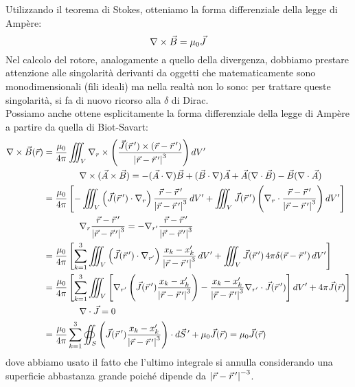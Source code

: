 Utilizzando il teorema di Stokes, otteniamo la forma differenziale della legge di Ampère:
\begin{equation}
	\nabla\times\vec{B} = \mu_0 \vec{J}
	\label{eq:ampere-diff}
\end{equation}
Nel calcolo del rotore, analogamente a quello della divergenza, dobbiamo prestare attenzione alle singolarità derivanti da oggetti che matematicamente sono monodimensionali (fili ideali) ma nella realtà non lo sono: per trattare queste singolarità, si fa di nuovo ricorso alla $ \delta $ di Dirac. \\ 
%
Possiamo anche ottene esplicitamente la forma differenziale della legge di Ampère a partire da quella di Biot-Savart:
\begin{equation}
	\begin{split}
	 	\nabla\times\vec{B}(\vec{r}) &= \displaystyle\frac{\mu_0}{4\pi} \iiint_V \nabla_r \times \left( \displaystyle\frac{\vec{J}(\vec{r}\,') \times (\vec{r} - \vec{r}\,')}{\left\lvert\vec{r} - \vec{r}\,'\right\rvert^3} \right) dV' \\
				     & \qquad\qquad \nabla\times(\vec{A}\times\vec{B}) = - (\vec{A}\cdot\nabla)\vec{B} + (\vec{B}\cdot\nabla)\vec{A} + \vec{A}(\nabla\cdot\vec{B}) - \vec{B}(\nabla\cdot\vec{A}) \\ 
				     &= \displaystyle\frac{\mu_0}{4\pi} \left[ - \iiint_V \left( \vec{J}(\vec{r}\,') \cdot \nabla_r \right) \frac{\vec{r} - \vec{r}\,'}{\left\lvert\vec{r} - \vec{r}\,'\right\rvert^3} \, dV' + \iiint_V \vec{J}(\vec{r}\,') \left( \nabla_r \cdot \frac{\vec{r} - \vec{r}\,'}{\left\lvert\vec{r} - \vec{r}\,'\right\rvert^3} \right) dV' \right] \\ 
				     & \qquad\qquad \nabla_r \frac{\vec{r} - \vec{r}\,'}{\left\lvert\vec{r} - \vec{r}\,'\right\rvert^3} = - \nabla_{r'} \frac{\vec{r} - \vec{r}\,'}{\left\lvert\vec{r} - \vec{r}\,'\right\rvert^3} \\ 
				     &= \displaystyle\frac{\mu_0}{4\pi} \left[ \displaystyle\sum_{k = 1}^{3} \iiint_V \left( \vec{J}(\vec{r}\,') \cdot \nabla_{r'} \right) \frac{x_k - x'_k}{\left\lvert\vec{r} - \vec{r}\,'\right\rvert^3} \, dV' + \iiint_V \vec{J}(\vec{r}\,') \, 4\pi \delta(\vec{r} - \vec{r}\,') \,  dV' \right] \\
				     &=  \displaystyle\frac{\mu_0}{4\pi} \left[ \displaystyle\sum_{k = 1}^{3} \iiint_V \left[ \nabla_{r'} \left( \vec{J}(\vec{r}\,') \frac{x_k - x'_k}{\left\lvert\vec{r} - \vec{r}\,'\right\rvert^3} \right) -  \frac{x_k - x'_k}{\left\lvert\vec{r} - \vec{r}\,'\right\rvert^3} \nabla_{r'} \cdot \vec{J}(\vec{r}\,') \right] dV' + 4\pi\vec{J}(\vec{r}) \right] \\ 
				     & \qquad\qquad \nabla\cdot\vec{J} = 0 \\ 
				     &= \displaystyle\frac{\mu_0}{4\pi} \displaystyle\sum_{k = 1}^{3} \oiint_S \left( \vec{J}(\vec{r}\,') \frac{x_k - x'_k}{\left\lvert\vec{r} - \vec{r}\,'\right\rvert^3} \right) \cdot d\vec{S}\,' + \mu_0 \vec{J}(\vec{r}) = \mu_0 \vec{J}(\vec{r})
	\end{split}
	\label{eq:}
\end{equation}
dove abbiamo usato il fatto che l'ultimo integrale si annulla considerando una superficie abbastanza grande poiché dipende da $ \left\lvert\vec{r} - \vec{r}\,'\right\rvert^{-3} $.


